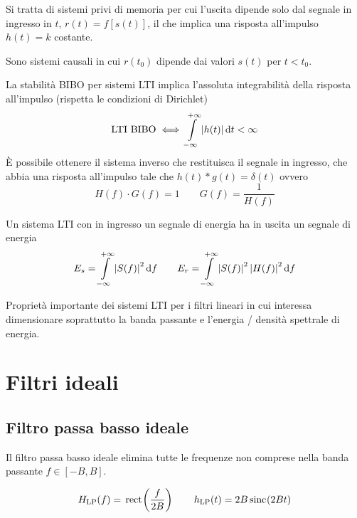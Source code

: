 Si tratta di sistemi privi di memoria per cui l'uscita dipende solo dal segnale in ingresso in $t$, $r(t)=f[s(t)]$, il che implica una risposta all'impulso $h(t)=k$ costante.

Sono sistemi causali in cui $r(t_0)$ dipende dai valori $s(t)$ per $t<t_0$.

La stabilità BIBO per sistemi LTI implica l'assoluta integrabilità della risposta all'impulso (rispetta le condizioni di Dirichlet)
\[ \text{LTI BIBO}\iff \int\limits_{-\infty}^{+\infty}{\left|{h(t)}\right|}{\,\mathop{}\!\mathrm{d}{t}}<\infty \]
\`{E} possibile ottenere il sistema inverso che restituisca il segnale in ingresso, che abbia una risposta all'impulso tale che $h(t)\ast g(t)=\delta(t)$ ovvero
\[H(f)\cdot G(f)=1 \qquad G(f)=\frac{1}{H(f)}\]

Un sistema LTI con in ingresso un segnale di energia ha in uscita un segnale di energia
\[ E_s=\int\limits_{-\infty}^{+\infty}{\left|{S(f)}\right|^2}{\,\mathop{}\!\mathrm{d}{f}} \qquad E_r=\int\limits_{-\infty}^{+\infty}{\left|{S(f)}\right|^2 \left|{H(f)}\right|^2}{\,\mathop{}\!\mathrm{d}{f}} \]
\begin{nota}Proprietà importante dei sistemi LTI per i filtri lineari in cui interessa dimensionare soprattutto la banda passante e l'energia / densità spettrale di energia.\end{nota}

\section{Filtri ideali}
\subsection{Filtro passa basso ideale}
Il filtro passa basso ideale elimina tutte le frequenze non comprese nella banda passante $f\in[-B,B]$.
\begin{figure}[!ht]
\centering{}
\end{figure}
\begin{equation}
H_\text{LP}(f)=\,{\operatorname{rect}}^{}\!\left({\frac{f}{2B}}\right)\qquad h_\text{LP}(t)=2B\,{\operatorname{sinc}}^{}\!\left({2 B t}\right)
\end{equation}\label{eq:filtro_passa_basso_ideale}

